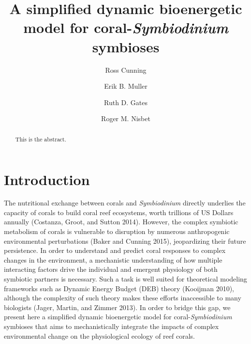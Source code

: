 \documentclass[]{elsarticle} %
\begin{document}
\begin{frontmatter}

  \title{A simplified dynamic bioenergetic model for coral-\emph{Symbiodinium}
symbioses}
    \author[University of Hawaii]{Ross Cunning}
    \author[University of California]{Erik B. Muller}
  
  
    \author[University of Hawaii]{Ruth D. Gates}
  
  
    \author[University of California]{Roger M. Nisbet}
  
  
      \address[University of Hawaii]{Hawaii Institute of Marine Biology, Kaneohe, HI 96744, USA}
    \address[University of California]{Department of Ecology, Evolution, and Marine Biology, Santa Barbara, CA
93106, USA}
  
  \begin{abstract}
  This is the abstract.
  \end{abstract}
  
 \end{frontmatter}

\section{Introduction}\label{introduction}

The nutritional exchange between corals and \emph{Symbiodinium} directly
underlies the capacity of corals to build coral reef ecosystems, worth
trillions of US Dollars annually (Costanza, Groot, and Sutton 2014).
However, the complex symbiotic metabolism of corals is vulnerable to
disruption by numerous anthropogenic environmental perturbations (Baker
and Cunning 2015), jeopardizing their future persistence. In order to
understand and predict coral responses to complex changes in the
environment, a mechanistic understanding of how multiple interacting
factors drive the individual and emergent physiology of both symbiotic
partners is necessary. Such a task is well suited for theoretical
modeling frameworks such as Dynamic Energy Budget (DEB) theory (Kooijman
2010), although the complexity of such theory makes these efforts
inaccessible to many biologists (Jager, Martin, and Zimmer 2013). In
order to bridge this gap, we present here a simplified dynamic
bioenergetic model for coral-\emph{Symbiodinium} symbioses that aims to
mechanistically integrate the impacts of complex environmental change on
the physiological ecology of reef corals.
\end{document}
